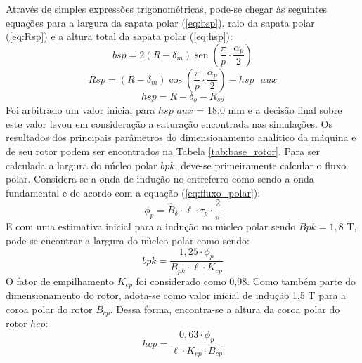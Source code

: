\documentclass[conference]{IEEEtran}
\begin{document}
Através de simples expressões trigonométricas, pode-se chegar às seguintes equações para a largura da sapata polar (\ref{eq:bsp}), raio da sapata polar (\ref{eq:Rsp}) e a altura total da sapata polar (\ref{eq:hsp}):
\begin{equation}
bsp = 2(R - \delta_{m}) \operatorname{sen} \left( \frac{\pi}{p} \cdot \frac{\alpha_p}{2} \right) 
\label{eq:bsp}
\end{equation}
\begin{equation}
Rsp = (R - \delta_{m}) \cos \left( \frac{\pi}{p} \cdot \frac{\alpha_p}{2} \right) - hsp\text{ }aux 
\label{eq:Rsp}
\end{equation}
\begin{equation}
hsp = R - \delta_o - R_{sp} 
\label{eq:hsp}
\end{equation}
Foi arbitrado um valor inicial para $hsp$ $aux$ = 18,0 mm e a decisão final sobre este valor levou em consideração a saturação encontrada nas simulações.
Os resultados dos principais parâmetros do dimensionamento analítico da máquina e de seu rotor podem ser encontrados na Tabela \ref{tab:base_rotor}. Para ser calculada a largura do núcleo polar $bpk$, deve-se primeiramente calcular o fluxo polar. Considera-se a onda de indução no entreferro como sendo a onda fundamental e de acordo com a equação (\ref{eq:fluxo_polar}):
\begin{equation}
\phi_p = \hat{B}_\delta \cdot \ell \cdot \tau_p \cdot \frac{2}{\pi}
\label{eq:fluxo_polar}
\end{equation}
E com uma estimativa inicial para a indução no núcleo polar sendo $Bpk = 1,8$ T, pode-se encontrar a largura do núcleo polar como sendo:
\begin{equation}
bpk = \frac{1,25 \cdot \phi_p}{B_{pk} \cdot \ell \cdot K_{ep} }
\label{eq:bpk}
\end{equation}
O fator de empilhamento $K_{ep}$ foi considerado como 0,98.
Como também parte do dimensionamento do rotor, adota-se como valor inicial de indução 1,5 T para a coroa polar do rotor $B_{cp}$. Dessa forma, encontra-se a altura da coroa polar do rotor $hcp$:
\begin{equation}
hcp = \frac{0,63 \cdot \phi_p}{\ell \cdot K_{ep} \cdot B_{cp}}
\label{eq:hcp}
\end{equation}
\end{document}
